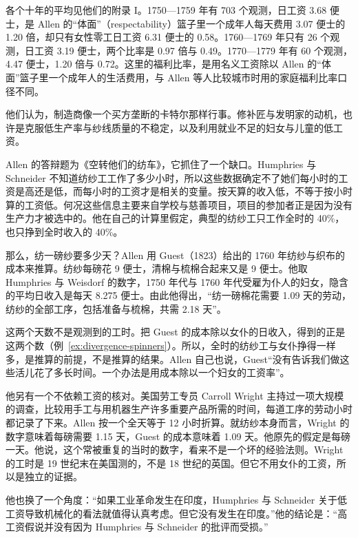 各个十年的平均见他们的附录 I。1750—1759 年有 703 个观测，日工资 3.68 便士，是 Allen 的“体面”（respectability）篮子里一个成年人每天费用 3.07 便士的 1.20 倍，却只有女性零工日工资 6.31 便士的 0.58。1760—1769 年只有 26 个观测，日工资 3.19 便士，两个比率是 0.97 倍与 0.49。1770—1779 年有 60 个观测，4.47 便士，1.20 倍与 0.72\cite{humphries2019spin}。这里的福利比率，是用名义工资除以 Allen 的“体面”篮子里一个成年人的生活费用\cite{humphries2019spin}，与 Allen 等人比较城市时用的家庭福利比率口径不同。

他们认为，制造商像一个买方垄断的卡特尔那样行事。修补匠与发明家的动机，也许是克服低生产率与纱线质量的不稳定，以及利用就业不足的妇女与儿童的低工资\cite{humphries2019spin}。

Allen 的答辩题为《空转他们的纺车》，它抓住了一个缺口。Humphries 与 Schneider 不知道纺纱工工作了多少小时，所以这些数据确定不了她们每小时的工资是高还是低，而每小时的工资才是相关的变量。按天算的收入低，不等于按小时算的工资低。何况这些信息主要来自学校与慈善项目，项目的参加者正是因为没有生产力才被选中的\cite{allen2018wheels}。他在自己的计算里假定，典型的纺纱工只工作全时的 40\%，也只挣到全时收入的 40\%\cite{allen2018wheels}。

那么，纺一磅纱要多少天？Allen 用 Guest（1823）给出的 1760 年纺纱与织布的成本来推算。纺纱每磅花 9 便士，清棉与梳棉合起来又是 9 便士\cite{allen2018wheels}。他取 Humphries 与 Weisdorf 的数字，1750 年代与 1760 年代受雇为仆人的妇女，隐含的平均日收入是每天 8.275 便士。由此他得出，“纺一磅棉花需要 1.09 天的劳动，纺纱的全部工序，包括准备与梳棉，共需 2.18 天”\cite{allen2018wheels}。

这两个天数不是观测到的工时。把 Guest 的成本除以女仆的日收入，得到的正是这两个数（例~\ref{ex:divergence-spinners}）。所以，全时的纺纱工与女仆挣得一样多，是推算的前提，不是推算的结果。Allen 自己也说，Guest“没有告诉我们做这些活儿花了多长时间。一个办法是用成本除以一个妇女的工资率”\cite{allen2018wheels}。

他另有一个不依赖工资的核对。美国劳工专员 Carroll Wright 主持过一项大规模的调查，比较用手工与用机器生产许多重要产品所需的时间，每道工序的劳动小时都记录了下来。Allen 按一个全天等于 12 小时折算。就纺纱本身而言，Wright 的数字意味着每磅需要 1.15 天，Guest 的成本意味着 1.09 天\cite{allen2018wheels}。他原先的假定是每磅一天。他说，这个常被重复的当时的数字，看来不是一个坏的经验法则\cite{allen2018wheels}。Wright 的工时是 19 世纪末在美国测的，不是 18 世纪的英国。但它不用女仆的工资，所以是独立的证据。

他也换了一个角度：“如果工业革命发生在印度，Humphries 与 Schneider 关于低工资导致机械化的看法就值得认真考虑。但它没有发生在印度。”\cite{allen2018wheels}他的结论是：“高工资假说并没有因为 Humphries 与 Schneider 的批评而受损。”\cite{allen2018wheels}

